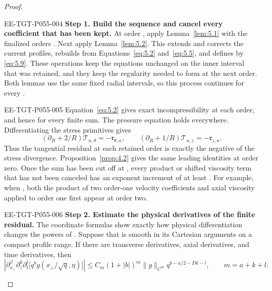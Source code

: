 \begin{proof}
\begin{EESegment}{EE-TGT-P055-004}
\textbf{Step 1. Build the sequence and cancel every coefficient that has been kept.}
At order , apply Lemma~\ref{lem:5.1} with the finalized orders
. Next apply Lemma~\ref{lem:5.2}. This extends and corrects the current profiles,
rebuilds  from Equations~\eqref{eq:5.2} and~\eqref{eq:5.5}, and defines
 by \eqref{eq:5.9}. These operations keep the equations unchanged on the inner
interval that was retained, and they keep the regularity needed to form  at the next
order. Both lemmas use the same fixed radial intervals, so this process continues for every
.
\end{EESegment}

\begin{EESegment}{EE-TGT-P055-005}
Equation~\eqref{eq:5.2} gives exact incompressibility at each order, and hence for every finite sum. The pressure equation
holds everywhere. Differentiating the stress primitives gives
\[
 (\partial_R+2/R)\mathcal T_{n,\theta}=-\mathfrak r_{\theta,n},
 \qquad
 (\partial_R+1/R)\mathcal T_{n,z}=-\mathfrak r_{z,n}.
\]
Thus the tangential residual at each retained order is exactly the negative of the stress divergence. Proposition~\ref{prop:4.2}
gives the same leading identities at order zero. Once the sum has been cut off at , every product
or shifted viscosity term that has not been canceled has an exponent increment of at least
. For example, when , both the product of two order-one velocity
coefficients and axial viscosity applied to order one first appear at order two.
\end{EESegment}

\begin{EESegment}{EE-TGT-P055-006}
\textbf{Step 2. Estimate the physical derivatives of the finite residual.}
The coordinate formulas show exactly how physical differentiation changes the powers of .
Suppose that  is smooth in its Cartesian arguments on a compact profile
range. If there are  transverse derivatives,  axial derivatives,
and  time derivatives, then
\begin{equation}
 \left|\partial_{x_\perp}^{\beta}\partial_z^k\partial_t^l
 \bigl[q^b g(x_\perp/\sqrt q,\eta)\bigr]\right|
 \leq C_m(1+|b|)^m\|g\|_{C^m}q^{b-a/2-Dk-l},
 \qquad m=a+k+l.
 \tag{5.26}\label{eq:5.26}
\end{equation}
\end{EESegment}


\end{proof}
